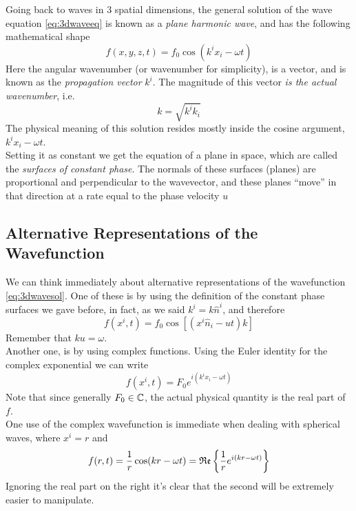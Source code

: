 \documentclass[../electromagnetism.tex]{subfiles}
\begin{document}
Going back to waves in 3 spatial dimensions, the general solution of the wave equation \eqref{eq:3dwaveeq} is known as a \textit{plane harmonic wave}, and has the following mathematical shape
\begin{equation}
	f(x,y,z,t)=f_0\cos\left( k^ix_i-\omega t \right)
	\label{eq:3dwavesol}
\end{equation}
Here the angular wavenumber (or wavenumber for simplicity), is a vector, and is known as the \textit{propagation vector} $k^i$. The magnitude of this vector \emph{is the actual wavenumber}, i.e.
\begin{equation*}
	k=\sqrt{k^ik_i}
\end{equation*}
The physical meaning of this solution resides mostly inside the cosine argument, $k^ix_i-\omega t$.\\
Setting it as constant we get the equation of a plane in space, which are called the \textit{surfaces of constant phase}. The normals of these surfaces (planes) are proportional and perpendicular to the wavevector, and these planes ``move'' in that direction at a rate equal to the phase velocity $u$
\subsection{Alternative Representations of the Wavefunction}
We can think immediately about alternative representations of the wavefunction \eqref{eq:3dwavesol}. One of these is by using the definition of the constant phase surfaces we gave before, in fact, as we said $k^i=k\hat{n}^i$, and therefore
\begin{equation*}
	f(x^i,t)=f_0\cos\left[ (x^i\hat{n}_i-ut)k \right]
\end{equation*}
Remember that $ku=\omega$.\\
Another one, is by using complex functions. Using the Euler identity for the complex exponential we can write
\begin{equation*}
	f(x^i,t)=F_0e^{i\left( k^ix_i-\omega t \right)}
\end{equation*}
Note that since generally $F_0\in\operatorname{\mathbb{C}}$, the actual physical quantity is the real part of $f$.\\
One use of the complex wavefunction is immediate when dealing with spherical waves, where $x^i=r$ and
\begin{equation}
	f(r,t)=\frac{1}{r}\cos(kr-\omega t)=\mathfrak{Re}\left\{ \frac{1}{r}e^{i(kr-\omega t)} \right\}
	\label{eq:sphericaleq}
\end{equation}
Ignoring the real part on the right it's clear that the second will be extremely easier to manipulate.
\end{document}
